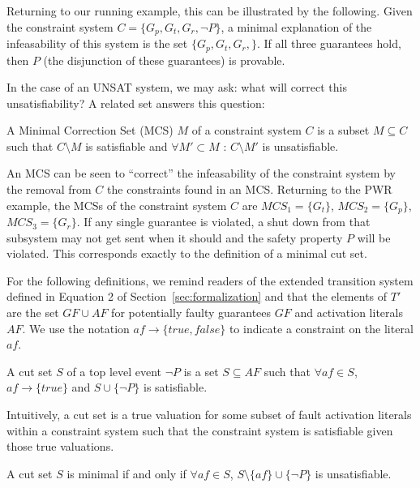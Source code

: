 Returning to our running example, this can be illustrated by the following. Given the constraint system $C = \{G_p, G_t, G_r, \neg P\}$, a minimal explanation of the infeasability of this system is the set $\{G_p, G_t, G_r,\}$. If all three guarantees hold, then $P$ (the disjunction of these guarantees) is provable. 

In the case of an UNSAT system, we may ask: what will correct this unsatisfiability? A related set answers this question: 
\begin{definition}
A Minimal Correction Set (MCS) $M$ of a constraint system $C$ is a subset $M\subseteq C$ such that $C \setminus M$ is satisfiable and $\forall M' \subset M$ : $C \setminus M'$ is unsatisfiable.
\end{definition}
An MCS can be seen to ``correct'' the infeasability of the constraint system by the removal from $C$ the constraints found in an MCS. Returning to the PWR example, the MCSs of the constraint system $C$ are $\mathit{MCS}_1 = \{G_t\}$, $\mathit{MCS}_2 = \{G_p\}$, $\mathit{MCS}_3 = \{G_r\}$. If any single guarantee is violated, a shut down from that subsystem may not get sent when it should and the safety property $P$ will be violated. This corresponds exactly to the definition of a minimal cut set.

For the following definitions, we remind readers of the extended transition system defined in Equation 2 of Section~\ref{sec:formalization} and that the elements of $T'$ are the set $\mathit{GF} \cup \mathit{AF}$ for potentially faulty guarantees $\mathit{GF}$ and activation literals $\mathit{AF}$. We use the notation $\mathit{af} \rightarrow \{\mathit{true}, \mathit{false}\}$ to indicate a constraint on the literal $\mathit{af}$. 

\begin{definition}
A cut set $S$ of a top level event $\neg P$ is a set $S \subseteq \mathit{AF}$ such that $\forall \mathit{af} \in S$, $\mathit{af} \rightarrow \{\mathit{true}\}$ and $S \cup \{\neg P\}$ is satisfiable.
\end{definition}

Intuitively, a cut set is a true valuation for some subset of fault activation literals within a constraint system such that the constraint system is satisfiable given those true valuations.

\begin{definition}
A cut set $S$ is minimal if and only if $\forall \mathit{af} \in S$, $S \setminus \{\mathit{af}\} \cup \{\neg P\}$ is unsatisfiable.
\end{definition}

